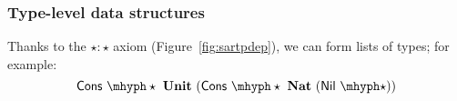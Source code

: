 \documentclass{article}
\begin{document}
\subsubsection{Type-level data structures}

Thanks to the $\star : \star$ axiom (Figure~\ref{fig:sartpdep}), we can form lists of types; for example:
\[
\appe{\mathsf{Cons}}{\star}\ \textbf{Unit}\ (\appe{\mathsf{Cons}}{\star}\ \textbf{Nat}\ (\appe{\mathsf{Nil}}{\star}))
\]

 
\end{document}
